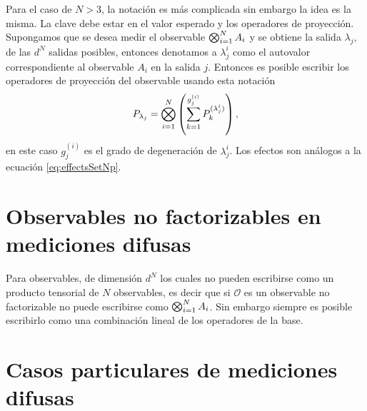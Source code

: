 \documentclass[12pt,oneside]{book}\raggedbottom{}
\begin{document}
Para el caso de $N>3$, la notación es más complicada sin embargo la idea es la misma. La clave debe estar en el valor esperado y los operadores de proyección.  Supongamos que se desea medir el observable $\bigotimes_{i=1}^{N} A_i$ y se obtiene la salida $\lambda_j$, de las $d^{N}$ salidas posibles, entonces denotamos a $\lambda_{j}^{i}$ como el autovalor correspondiente al observable $A_i$ en la salida $j$. Entonces es posible escribir los operadores de proyección del observable usando esta notación \[P_{\lambda_j}=\bigotimes_{i=1}^{N} \left(\sum_{k=1}^{g_{j}^{(i)}} P_k^{(\lambda_j^{i})}\right),\] en este caso $g_j^{(i)}$  es el grado de degeneración de $\lambda_{j}^{i}$. Los efectos son análogos a la ecuación {\eqref{eq:effectsSetNp}}.

\section*{Observables no factorizables en mediciones difusas}

Para observables, de dimensión $d^N$ los cuales no pueden escribirse como un producto tensorial de $N$ observables, es decir que si $\mathcal{O}$ es un observable no factorizable no puede escribirse como $\bigotimes_{i=1}^{N} A_i$. Sin embargo siempre es posible escribirlo como una combinación lineal de los operadores de la base.  

\section*{Casos particulares de mediciones difusas}

\end{document}
